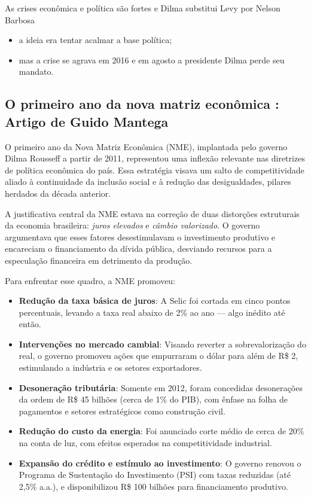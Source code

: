 \documentclass[a4paper,12pt]{article}[abntex2]
\begin{document}
As crises econômica e política são fortes e Dilma substitui Levy por Nelson Barbosa

\begin{itemize}
    \item a ideia era tentar acalmar a base política;
    \item mas a crise se agrava em 2016 e em agosto a presidente Dilma perde seu mandato.
\end{itemize}

\subsection{\textbf{O primeiro ano da nova matriz econômica : Artigo de Guido Mantega}}
O primeiro ano da Nova Matriz Econômica (NME), implantada pelo governo Dilma Rousseff a partir de 2011, representou uma inflexão relevante nas diretrizes de política econômica do país. Essa estratégia visava um salto de competitividade aliado à continuidade da inclusão social e à redução das desigualdades, pilares herdados da década anterior.

A justificativa central da NME estava na correção de duas distorções estruturais da economia brasileira: \textit{juros elevados} e \textit{câmbio valorizado}. O governo argumentava que esses fatores desestimulavam o investimento produtivo e encareciam o financiamento da dívida pública, desviando recursos para a especulação financeira em detrimento da produção.

Para enfrentar esse quadro, a NME promoveu:

\begin{itemize}
    \item \textbf{Redução da taxa básica de juros}: A Selic foi cortada em cinco pontos percentuais, levando a taxa real abaixo de 2\% ao ano --- algo inédito até então.
    \item \textbf{Intervenções no mercado cambial}: Visando reverter a sobrevalorização do real, o governo promoveu ações que empurraram o dólar para além de R\$ 2, estimulando a indústria e os setores exportadores.
    \item \textbf{Desoneração tributária}: Somente em 2012, foram concedidas desonerações da ordem de R\$ 45 bilhões (cerca de 1\% do PIB), com ênfase na folha de pagamentos e setores estratégicos como construção civil.
    \item \textbf{Redução do custo da energia}: Foi anunciado corte médio de cerca de 20\% na conta de luz, com efeitos esperados na competitividade industrial.
    \item \textbf{Expansão do crédito e estímulo ao investimento}: O governo renovou o Programa de Sustentação do Investimento (PSI) com taxas reduzidas (até 2,5\% a.a.), e disponibilizou R\$ 100 bilhões para financiamento produtivo.
\end{itemize}
\end{document}
